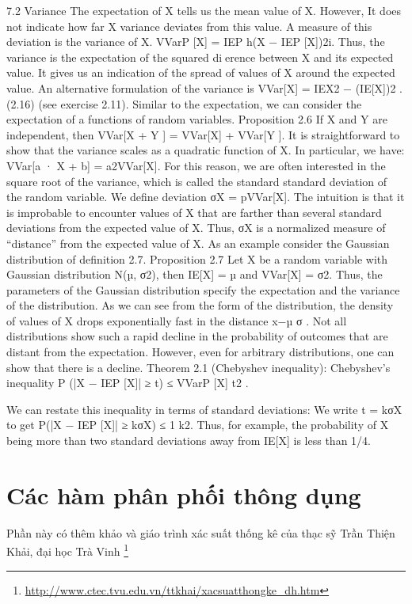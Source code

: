 7.2 Variance
The expectation of X tells us the mean value of X. However, It does not indicate how far X variance deviates from this value. A measure of this deviation is the variance of X. VVarP [X] = IEP h(X − IEP [X])2i. Thus, the variance is the expectation of the squared dierence between X and its expected value. It gives us an indication of the spread of values of X around the expected value. An alternative formulation of the variance is VVar[X] = IEX2 − (IE[X])2 . (2.16) (see exercise 2.11). Similar to the expectation, we can consider the expectation of a functions of random variables. Proposition 2.6 If X and Y are independent, then VVar[X + Y ] = VVar[X] + VVar[Y ]. It is straightforward to show that the variance scales as a quadratic function of X. In particular, we have: VVar[a · X + b] = a2VVar[X]. For this reason, we are often interested in the square root of the variance, which is called the standard standard deviation of the random variable. We define deviation σX = pVVar[X]. The intuition is that it is improbable to encounter values of X that are farther than several standard deviations from the expected value of X. Thus, σX is a normalized measure of “distance” from the expected value of X. As an example consider the Gaussian distribution of definition 2.7. Proposition 2.7 Let X be a random variable with Gaussian distribution N(µ, σ2), then IE[X] = µ and VVar[X] = σ2. Thus, the parameters of the Gaussian distribution specify the expectation and the variance of the distribution. As we can see from the form of the distribution, the density of values of X drops exponentially fast in the distance x−µ σ . Not all distributions show such a rapid decline in the probability of outcomes that are distant from the expectation. However, even for arbitrary distributions, one can show that there is a decline. Theorem 2.1 (Chebyshev inequality): Chebyshev’s inequality P (|X − IEP [X]| ≥ t) ≤ VVarP [X] t2 .

We can restate this inequality in terms of standard deviations: We write t = kσX to get P(|X − IEP [X]| ≥ kσX) ≤ 1 k2. Thus, for example, the probability of X being more than two standard deviations away from IE[X] is less than 1/4.

\section{Các hàm phân phối thông dụng}

Phần này có thêm khảo \cite{Goodfellow-et-al-2016} và giáo trình xác suất thống kê của thạc sỹ Trần Thiện Khải, đại học Trà Vinh  \footnote{\href{http://www.ctec.tvu.edu.vn/ttkhai/xacsuatthongke_dh.htm}{http://www.ctec.tvu.edu.vn/ttkhai/xacsuatthongke\_dh.htm}}

